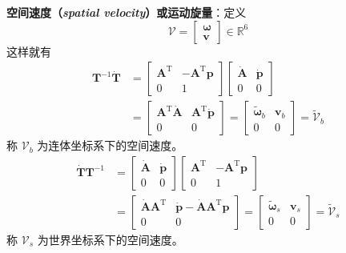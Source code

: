 \textbf{空间速度（\textit{spatial velocity}）或运动旋量}：定义
\begin{equation}
	\label{eq:运动旋量:定义}
	\mathcal{V}=\begin{bmatrix}
		\boldsymbol{\omega}\\
		\boldsymbol{v}
	\end{bmatrix}\in\mathbb{R}^{6}
\end{equation}
这样就有
\begin{equation}
	\label{eq:运动旋量:体旋量}
	\begin{aligned}
		\boldsymbol{T}^{-1}\dot{\boldsymbol{T}}
		&=\begin{bmatrix}
			\boldsymbol{A}^{\mathrm{T}} & -\boldsymbol{A}^{\mathrm{T}}\boldsymbol{p}\\
			0 & 1
		\end{bmatrix}
		\begin{bmatrix}
			\dot{\boldsymbol{A}} & \dot{\boldsymbol{p}}\\
			0 & 0
		\end{bmatrix}\\
		&=\begin{bmatrix}
			\boldsymbol{A}^{\mathrm{T}}\dot{\boldsymbol{A}} & \boldsymbol{A}^{\mathrm{T}}\dot{\boldsymbol{p}}\\
			0 & 0
		\end{bmatrix}
		=\begin{bmatrix}
			\tilde{\boldsymbol{\omega}}_{b} & \boldsymbol{v}_{b}\\
			0 & 0
		\end{bmatrix}
		=\tilde{\mathcal{V}}_{b}
	\end{aligned}
\end{equation}
称 $\mathcal{V}_{b}$ 为连体坐标系下的空间速度。
\begin{equation}
	\label{eq:运动旋量:空间旋量}
	\begin{aligned}
		\dot{\boldsymbol{T}}\boldsymbol{T}^{-1}
		&=\begin{bmatrix}
			\dot{\boldsymbol{A}} & \dot{\boldsymbol{p}}\\
			0 & 0
		\end{bmatrix}
		\begin{bmatrix}
			\boldsymbol{A}^{\mathrm{T}} & -\boldsymbol{A}^{\mathrm{T}}\boldsymbol{p}\\
			0 & 1
		\end{bmatrix}\\
		&=\begin{bmatrix}
			\dot{\boldsymbol{A}}\boldsymbol{A}^{\mathrm{T}} & \dot{\boldsymbol{p}}-\dot{\boldsymbol{A}}\boldsymbol{A}^{\mathrm{T}}\boldsymbol{p}\\
			0 & 0
		\end{bmatrix}
		=\begin{bmatrix}
			\tilde{\boldsymbol{\omega}}_{s} & \boldsymbol{v}_{s}\\
			0 & 0
		\end{bmatrix}
		=\tilde{\mathcal{V}}_{s}
	\end{aligned}
\end{equation}
称 $\mathcal{V}_{s}$ 为世界坐标系下的空间速度。

